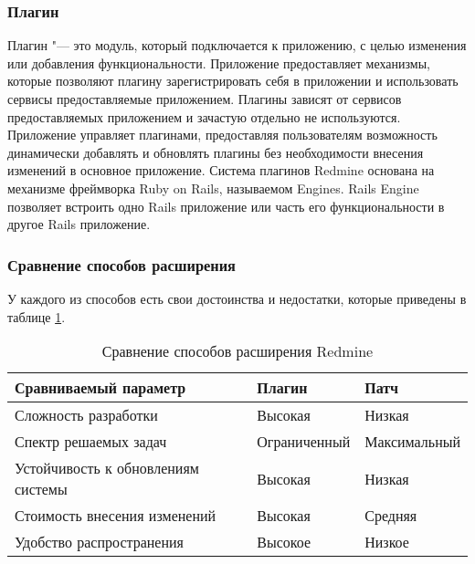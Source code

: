 \subsubsection{Плагин}
Плагин "--- это модуль, который подключается к приложению, с целью изменения
или добавления функциональности. Приложение предоставляет механизмы, которые
позволяют плагину зарегистрировать себя в приложении и использовать сервисы
предоставляемые приложением. Плагины зависят от сервисов предоставляемых
приложением и зачастую отдельно не используются. Приложение управляет
плагинами, предоставляя пользователям возможность динамически добавлять и
обновлять плагины без необходимости внесения изменений в основное приложение.
Система плагинов Redmine основана на механизме фреймворка Ruby on Rails,
называемом Engines. Rails Engine позволяет встроить одно Rails приложение или
часть его функциональности в другое Rails приложение.

\subsubsection{Сравнение способов расширения}
У каждого из способов есть свои достоинства и недостатки, которые приведены в
таблице \ref{comparing_extensions}.
\begin{table}[hb!]

\makeatletter
\def\@makecaption#1#2{
  \vskip\abovecaptionskip
  \sbox\@tempboxa{#2 #1}
  \begin{flushright}
    #1
  \end{flushright}
  \begin{center}
    \textbf{#2}
  \end{center}
  \vskip\belowcaptionskip}
\makeatother

\caption{Сравнение способов расширения Redmine}
\small
\centering
\begin{tabular}{ 
|>{\centering\arraybackslash}m{}
|>{\centering\arraybackslash}m{}
|>{\centering\arraybackslash}m{}|}
\hline
\textbf{Сравниваемый параметр} & \textbf{Плагин} & \textbf{Патч}\\
\hline
Сложность разработки & Высокая & Низкая \\
\hline
Спектр решаемых задач & Ограниченный & Максимальный\\
\hline
Устойчивость к обновлениям системы & Высокая & Низкая \\
\hline
Стоимость внесения изменений & Высокая & Средняя \\
\hline
Удобство распространения & Высокое & Низкое \\
\hline
\end{tabular}

\label{comparing_extensions}
\end{table}

